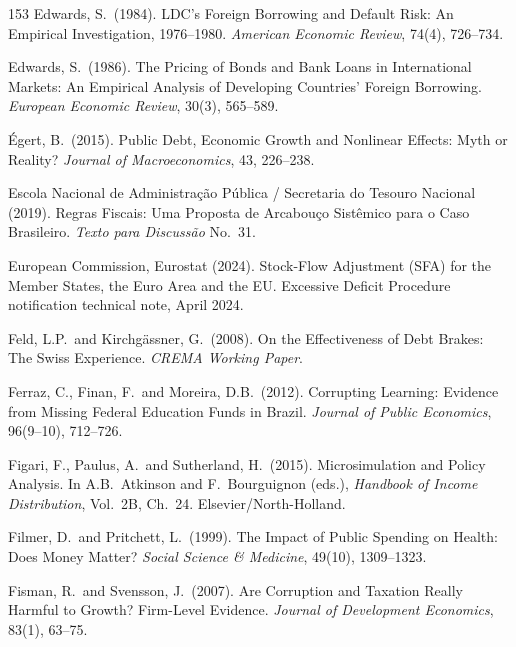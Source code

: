 \documentclass[11pt,a4paper]{article}
\begin{document}
\begin{thebibliography}{153}
 Edwards, S.\ (1984). LDC's Foreign Borrowing and Default Risk: An Empirical Investigation, 1976--1980. \textit{American Economic Review}, 74(4), 726--734.

 Edwards, S.\ (1986). The Pricing of Bonds and Bank Loans in International Markets: An Empirical Analysis of Developing Countries' Foreign Borrowing. \textit{European Economic Review}, 30(3), 565--589.

 \'Egert, B.\ (2015). Public Debt, Economic Growth and Nonlinear Effects: Myth or Reality? \textit{Journal of Macroeconomics}, 43, 226--238.

 Escola Nacional de Administra\c{c}\~ao P\'ublica / Secretaria do Tesouro Nacional (2019). Regras Fiscais: Uma Proposta de Arcabou\c{c}o Sist\^emico para o Caso Brasileiro. \textit{Texto para Discuss\~ao} No.\ 31.

 European Commission, Eurostat (2024). Stock-Flow Adjustment (SFA) for the Member States, the Euro Area and the EU. Excessive Deficit Procedure notification technical note, April 2024.

 Feld, L.P.\ and Kirchg\"assner, G.\ (2008). On the Effectiveness of Debt Brakes: The Swiss Experience. \textit{CREMA Working Paper}.

 Ferraz, C., Finan, F.\ and Moreira, D.B.\ (2012). Corrupting Learning: Evidence from Missing Federal Education Funds in Brazil. \textit{Journal of Public Economics}, 96(9--10), 712--726.

 Figari, F., Paulus, A.\ and Sutherland, H.\ (2015). Microsimulation and Policy Analysis. In A.B.\ Atkinson and F.\ Bourguignon (eds.), \textit{Handbook of Income Distribution}, Vol.\ 2B, Ch.\ 24. Elsevier/North-Holland.

 Filmer, D.\ and Pritchett, L.\ (1999). The Impact of Public Spending on Health: Does Money Matter? \textit{Social Science \& Medicine}, 49(10), 1309--1323.

 Fisman, R.\ and Svensson, J.\ (2007). Are Corruption and Taxation Really Harmful to Growth? Firm-Level Evidence. \textit{Journal of Development Economics}, 83(1), 63--75.


\end{thebibliography}
\end{document}
